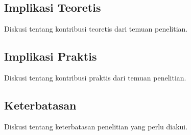 \subsection{Implikasi Teoretis}
\label{subsec:implikasi_teoretis}

Diskusi tentang kontribusi teoretis dari temuan penelitian.

\subsection{Implikasi Praktis}
\label{subsec:implikasi_praktis}

Diskusi tentang kontribusi praktis dari temuan penelitian.

\subsection{Keterbatasan}
\label{subsec:keterbatasan}

Diskusi tentang keterbatasan penelitian yang perlu diakui.